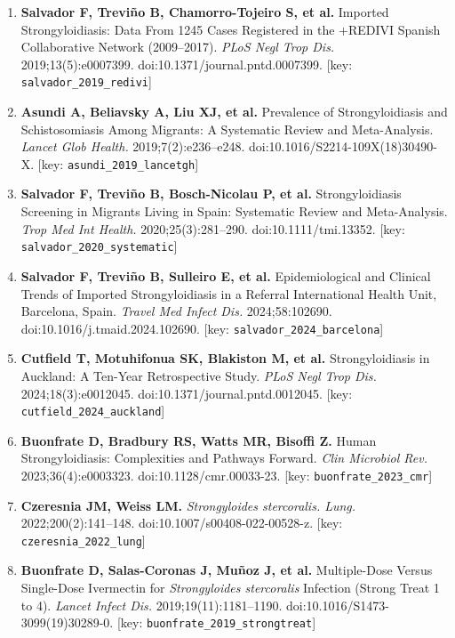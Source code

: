 \documentclass[
  spanish,
  12pt,
  a4paper,
]{article}
\providecommand{\tightlist}{%
  \setlength{\itemsep}{0pt}\setlength{\parskip}{0pt}}
\begin{document}
\begin{enumerate}
\def\labelenumi{\arabic{enumi}.}
\tightlist
\item
  \textbf{Salvador F, Treviño B, Chamorro-Tojeiro S, et al.} Imported
  Strongyloidiasis: Data From 1245 Cases Registered in the +REDIVI
  Spanish Collaborative Network (2009--2017). \emph{PLoS Negl Trop Dis.}
  2019;13(5):e0007399. doi:10.1371/journal.pntd.0007399. {[}key:
  \texttt{salvador\_2019\_redivi}{]}
\item
  \textbf{Asundi A, Beliavsky A, Liu XJ, et al.} Prevalence of
  Strongyloidiasis and Schistosomiasis Among Migrants: A Systematic
  Review and Meta-Analysis. \emph{Lancet Glob Health.}
  2019;7(2):e236--e248. doi:10.1016/S2214-109X(18)30490-X. {[}key:
  \texttt{asundi\_2019\_lancetgh}{]}
\item
  \textbf{Salvador F, Treviño B, Bosch-Nicolau P, et al.}
  Strongyloidiasis Screening in Migrants Living in Spain: Systematic
  Review and Meta-Analysis. \emph{Trop Med Int Health.}
  2020;25(3):281--290. doi:10.1111/tmi.13352. {[}key:
  \texttt{salvador\_2020\_systematic}{]}
\item
  \textbf{Salvador F, Treviño B, Sulleiro E, et al.} Epidemiological and
  Clinical Trends of Imported Strongyloidiasis in a Referral
  International Health Unit, Barcelona, Spain. \emph{Travel Med Infect
  Dis.} 2024;58:102690. doi:10.1016/j.tmaid.2024.102690. {[}key:
  \texttt{salvador\_2024\_barcelona}{]}
\item
  \textbf{Cutfield T, Motuhifonua SK, Blakiston M, et al.}
  Strongyloidiasis in Auckland: A Ten-Year Retrospective Study.
  \emph{PLoS Negl Trop Dis.} 2024;18(3):e0012045.
  doi:10.1371/journal.pntd.0012045. {[}key:
  \texttt{cutfield\_2024\_auckland}{]}
\item
  \textbf{Buonfrate D, Bradbury RS, Watts MR, Bisoffi Z.} Human
  Strongyloidiasis: Complexities and Pathways Forward. \emph{Clin
  Microbiol Rev.} 2023;36(4):e0003323. doi:10.1128/cmr.00033-23. {[}key:
  \texttt{buonfrate\_2023\_cmr}{]}
\item
  \textbf{Czeresnia JM, Weiss LM.} \emph{Strongyloides stercoralis.
  Lung.} 2022;200(2):141--148. doi:10.1007/s00408-022-00528-z. {[}key:
  \texttt{czeresnia\_2022\_lung}{]}
\item
  \textbf{Buonfrate D, Salas-Coronas J, Muñoz J, et al.} Multiple-Dose
  Versus Single-Dose Ivermectin for \emph{Strongyloides stercoralis}
  Infection (Strong Treat 1 to 4). \emph{Lancet Infect Dis.}
  2019;19(11):1181--1190. doi:10.1016/S1473-3099(19)30289-0. {[}key:
  \texttt{buonfrate\_2019\_strongtreat}{]}

\end{enumerate}
\end{document}

